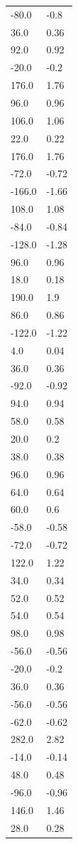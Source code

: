 \begin{longtable}{ll}
-80.0 & -0.8 \\
36.0 & 0.36 \\
92.0 & 0.92 \\
-20.0 & -0.2 \\
176.0 & 1.76 \\
96.0 & 0.96 \\
106.0 & 1.06 \\
22.0 & 0.22 \\
176.0 & 1.76 \\
-72.0 & -0.72 \\
-166.0 & -1.66 \\
108.0 & 1.08 \\
-84.0 & -0.84 \\
-128.0 & -1.28 \\
96.0 & 0.96 \\
18.0 & 0.18 \\
190.0 & 1.9 \\
86.0 & 0.86 \\
-122.0 & -1.22 \\
4.0 & 0.04 \\
36.0 & 0.36 \\
-92.0 & -0.92 \\
94.0 & 0.94 \\
58.0 & 0.58 \\
20.0 & 0.2 \\
38.0 & 0.38 \\
96.0 & 0.96 \\
64.0 & 0.64 \\
60.0 & 0.6 \\
-58.0 & -0.58 \\
-72.0 & -0.72 \\
122.0 & 1.22 \\
34.0 & 0.34 \\
52.0 & 0.52 \\
54.0 & 0.54 \\
98.0 & 0.98 \\
-56.0 & -0.56 \\
-20.0 & -0.2 \\
36.0 & 0.36 \\
-56.0 & -0.56 \\
-62.0 & -0.62 \\
282.0 & 2.82 \\
-14.0 & -0.14 \\
48.0 & 0.48 \\
-96.0 & -0.96 \\
146.0 & 1.46 \\
28.0 & 0.28 \\

\end{longtable}
